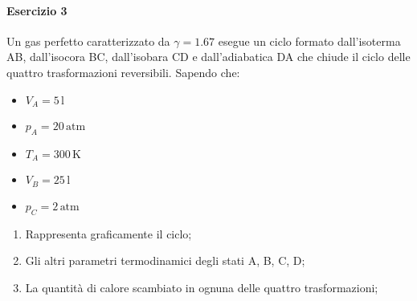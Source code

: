 \paragraph{Esercizio 3}
Un gas perfetto caratterizzato da $\gamma = 1.67$ esegue un ciclo formato dall'isoterma AB, 
dall'isocora BC, dall'isobara CD e dall'adiabatica DA che chiude il ciclo delle quattro trasformazioni
reversibili. Sapendo che:
\begin{multicols}{2}
	\begin{itemize}
		\item $V_A = 5\,\text{l}$
		\item $p_A = 20\,\text{atm}$
		\item $T_A = 300\,\text{K}$
		\item $V_B = 25\,\text{l}$
		\item $p_C = 2\,\text{atm}$
	\end{itemize}
\end{multicols}
\begin{enumerate}[label=$\alph*)$]
	\item Rappresenta graficamente il ciclo;
	\item Gli altri parametri termodinamici degli stati A, B, C, D;
	\item La quantità di calore scambiato in ognuna delle quattro trasformazioni;
\end{enumerate}
\divisor

